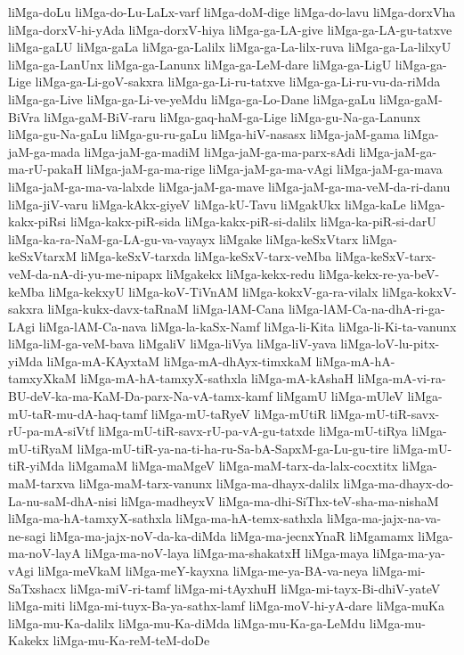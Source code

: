 {liMga-doLu
liMga-do-Lu-LaLx-varf
liMga-doM-dige
liMga-do-lavu
liMga-dorxVha
liMga-dorxV-hi-yAda
liMga-dorxV-hiya
liMga-ga-LA-give
liMga-ga-LA-gu-tatxve
liMga-gaLU
liMga-gaLa
liMga-ga-Lalilx
liMga-ga-La-lilx-ruva
liMga-ga-La-lilxyU
liMga-ga-LanUnx
liMga-ga-Lanunx
liMga-ga-LeM-dare
liMga-ga-LigU
liMga-ga-Lige
liMga-ga-Li-goV-sakxra
liMga-ga-Li-ru-tatxve
liMga-ga-Li-ru-vu-da-riMda
liMga-ga-Live
liMga-ga-Li-ve-yeMdu
liMga-ga-Lo-Dane
liMga-gaLu
liMga-gaM-BiVra
liMga-gaM-BiV-raru
liMga-gaq-haM-ga-Lige
liMga-gu-Na-ga-Lanunx
liMga-gu-Na-gaLu
liMga-gu-ru-gaLu
liMga-hiV-nasasx
liMga-jaM-gama
liMga-jaM-ga-mada
liMga-jaM-ga-madiM
liMga-jaM-ga-ma-parx-sAdi
liMga-jaM-ga-ma-rU-pakaH
liMga-jaM-ga-ma-rige
liMga-jaM-ga-ma-vAgi
liMga-jaM-ga-mava
liMga-jaM-ga-ma-va-lalxde
liMga-jaM-ga-mave
liMga-jaM-ga-ma-veM-da-ri-danu
liMga-jiV-varu
liMga-kAkx-giyeV
liMga-kU-Tavu
liMgakUkx
liMga-kaLe
liMga-kakx-piRsi
liMga-kakx-piR-sida
liMga-kakx-piR-si-dalilx
liMga-ka-piR-si-darU
liMga-ka-ra-NaM-ga-LA-gu-va-vayayx
liMgake
liMga-keSxVtarx
liMga-keSxVtarxM
liMga-keSxV-tarxda
liMga-keSxV-tarx-veMba
liMga-keSxV-tarx-veM-da-nA-di-yu-me-nipapx
liMgakekx
liMga-kekx-redu
liMga-kekx-re-ya-beV-keMba
liMga-kekxyU
liMga-koV-TiVnAM
liMga-kokxV-ga-ra-vilalx
liMga-kokxV-sakxra
liMga-kukx-davx-taRnaM
liMga-lAM-Cana
liMga-lAM-Ca-na-dhA-ri-ga-LAgi
liMga-lAM-Ca-nava
liMga-la-kaSx-Namf
liMga-li-Kita
liMga-li-Ki-ta-vanunx
liMga-liM-ga-veM-bava
liMgaliV
liMga-liVya
liMga-liV-yava
liMga-loV-lu-pitx-yiMda
liMga-mA-KAyxtaM
liMga-mA-dhAyx-timxkaM
liMga-mA-hA-tamxyXkaM
liMga-mA-hA-tamxyX-sathxla
liMga-mA-kAshaH
liMga-mA-vi-ra-BU-deV-ka-ma-KaM-Da-parx-Na-vA-tamx-kamf
liMgamU
liMga-mUleV
liMga-mU-taR-mu-dA-haq-tamf
liMga-mU-taRyeV
liMga-mUtiR
liMga-mU-tiR-savx-rU-pa-mA-siVtf
liMga-mU-tiR-savx-rU-pa-vA-gu-tatxde
liMga-mU-tiRya
liMga-mU-tiRyaM
liMga-mU-tiR-ya-na-ti-ha-ru-Sa-bA-SapxM-ga-Lu-gu-tire
liMga-mU-tiR-yiMda
liMgamaM
liMga-maMgeV
liMga-maM-tarx-da-lalx-cocxtitx
liMga-maM-tarxva
liMga-maM-tarx-vanunx
liMga-ma-dhayx-dalilx
liMga-ma-dhayx-do-La-nu-saM-dhA-nisi
liMga-madheyxV
liMga-ma-dhi-SiThx-teV-sha-ma-nishaM
liMga-ma-hA-tamxyX-sathxla
liMga-ma-hA-temx-sathxla
liMga-ma-jajx-na-va-ne-sagi
liMga-ma-jajx-noV-da-ka-diMda
liMga-ma-jecnxYnaR
liMgamamx
liMga-ma-noV-layA
liMga-ma-noV-laya
liMga-ma-shakatxH
liMga-maya
liMga-ma-ya-vAgi
liMga-meVkaM
liMga-meY-kayxna
liMga-me-ya-BA-va-neya
liMga-mi-SaTxshacx
liMga-miV-ri-tamf
liMga-mi-tAyxhuH
liMga-mi-tayx-Bi-dhiV-yateV
liMga-miti
liMga-mi-tuyx-Ba-ya-sathx-lamf
liMga-moV-hi-yA-dare
liMga-muKa
liMga-mu-Ka-dalilx
liMga-mu-Ka-diMda
liMga-mu-Ka-ga-LeMdu
liMga-mu-Kakekx
liMga-mu-Ka-reM-teM-doDe
}
